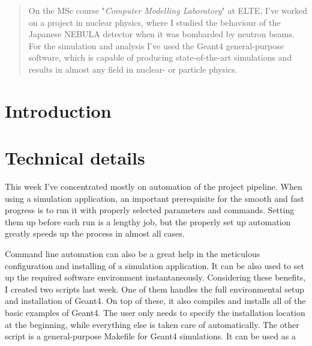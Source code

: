 \begin{abstract}
	On the MSc course "\textit{Computer Modelling Laboratory}" at ELTE, I've worked on a project in nuclear physics, where I studied the behaviour of the Japanese NEBULA detector when it was bombarded by neutron beams. For the simulation and analysis I've used the Geant4 general-purpose software, which is capable of producing state-of-the-art simulations and results in almost any field in nuclear- or particle physics.
\end{abstract}

\section{Introduction}


\section{Technical details}
This week I've concentrated mostly on automation of the project pipeline. When using a simulation application, an important prerequisite for the smooth and fast progress is to run it with properly selected parameters and commands. Setting them up before each run is a lengthy job, but the properly set up automation greatly speeds up the process in almost all cases.

Command line automation can also be a great help in the meticulous configuration and installing of a simulation application. It can be also used to set up the required software environment instantaneously. Considering these benefits, I created two scripts last week. One of them handles the full environmental setup and installation of Geant4. On top of these, it also compiles and installs all of the basic examples of Geant4. The user only needs to specify the installation location at the beginning, while everything else is taken care of automatically.
The other script is a general-purpose Makefile for Geant4 simulations. It can be used as a 